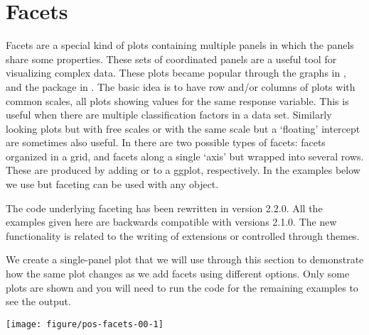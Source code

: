 \documentclass[krantz2]{krantz}\usepackage{knitr}%
\begin{document}
\section{Facets}
Facets are a special kind of plots containing multiple panels in which the panels share some properties.
These sets of coordinated panels are a useful tool for visualizing complex data. These plots became popular through the  graphs in , and the  package in \Rlang. The basic idea is to have row and/or columns of plots with common scales, all plots showing values for the same response variable. This is useful when there are multiple classification factors in a data set. Similarly looking plots but with free scales or with the same scale but a `floating' intercept are sometimes also useful. In \ggplot there are two possible types of facets: facets organized in a grid, and facets along a single `axis' but wrapped into several rows. These are produced by adding  or  to a ggplot, respectively. In the examples below we use  but faceting can be used with any  object.

\begin{warningbox}
  The code underlying faceting has been rewritten in \ggplot version 2.2.0. All the examples given here are backwards compatible with versions 2.1.0. The new functionality is related to the writing of extensions or controlled through themes.
\end{warningbox}



We create a single-panel plot that we will use through this section to demonstrate how the same plot changes as we add facets using different options. Only some plots are shown and you will need to run the code for the remaining examples to see the output.

\begin{knitrout}\footnotesize
{}\color{fgcolor}\begin{kframe}
\begin{alltt}
 \hlkwb{<-} \hlstd{(}   \hlopt{+} \hlstd{()}
\end{alltt}
\end{kframe}

{\centering \texttt{[image: figure/pos-facets-00-1]} 

}



\end{knitrout}
\end{document}
